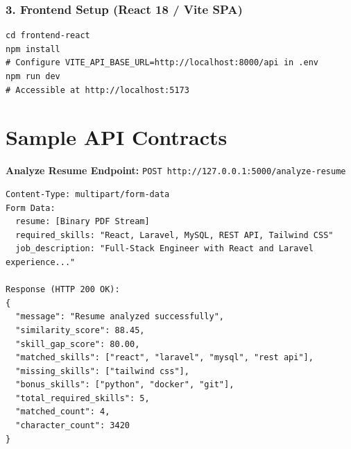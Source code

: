 \subsubsection{3. Frontend Setup (React 18 / Vite SPA)}
\begin{verbatim}
cd frontend-react
npm install
# Configure VITE_API_BASE_URL=http://localhost:8000/api in .env
npm run dev
# Accessible at http://localhost:5173
\end{verbatim}

\section{Sample API Contracts}
\noindent \textbf{Analyze Resume Endpoint:} \texttt{POST http://127.0.0.1:5000/analyze-resume}
\begin{verbatim}
Content-Type: multipart/form-data
Form Data:
  resume: [Binary PDF Stream]
  required_skills: "React, Laravel, MySQL, REST API, Tailwind CSS"
  job_description: "Full-Stack Engineer with React and Laravel experience..."

Response (HTTP 200 OK):
{
  "message": "Resume analyzed successfully",
  "similarity_score": 88.45,
  "skill_gap_score": 80.00,
  "matched_skills": ["react", "laravel", "mysql", "rest api"],
  "missing_skills": ["tailwind css"],
  "bonus_skills": ["python", "docker", "git"],
  "total_required_skills": 5,
  "matched_count": 4,
  "character_count": 3420
}
\end{verbatim}